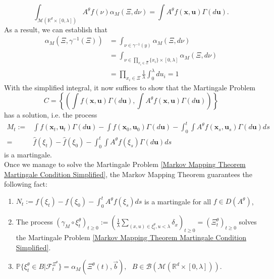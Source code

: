 \documentclass[12pt]{article}
\def \hat{\widehat}
\newcommand{\meanq}{\vec b}    %
\begin{document}
\begin{equation}
\int_{\mathcal{M}(\mathbb{R}^d\times [0,\lambda])}A^{\theta}f(\nu)\alpha_M(\Xi,d\nu)= \int   A^{\theta}f(\textbf{x},\textbf{u})\Gamma(d\textbf{u}). 
\end{equation}
As a result, we can establish that
\begin{equation}
\begin{aligned}
\alpha_M(\Xi,\gamma^{-1}(\Xi)) &= \int_{\nu \in \gamma^{-1}(y)}\alpha_M (\Xi,d\nu) \\
&= \int_{\nu \in \prod_{x_i \in \Xi} \{x_i\}\times [0,\lambda]}\alpha_M (\Xi,d\nu)\\
&= \prod_{x_i \in \Xi}\frac{1}{\lambda}\int_{0}^{\lambda} du_i =1
\end{aligned}
\end{equation}
With the simplified integral, it now suffices to show that the Martingale Problem 
\begin{equation}\label{Markov Mapping Theorem Martingale Condition Simplified}
C = \left\{\left(\int   f(\textbf{x},\textbf{u})\Gamma(d\textbf{u}),\int   A^{\theta}f(\textbf{x},\textbf{u})\Gamma(d\textbf{u})\right)\right\}    
\end{equation}
has a solution, i.e. the process
\begin{equation}
\begin{aligned}
M_t:=& \int   f(\textbf{x}_t,\textbf{u}_t)\Gamma(d\textbf{u})-\int   f(\textbf{x}_0,\textbf{u}_0)\Gamma(d\textbf{u})-\int_{0}^{t}\int   A^{\theta}f(\textbf{x}_s,\textbf{u}_s)\Gamma(d\textbf{u})ds\\
=&\hat{f}(\xi_t)-\hat{f}(\xi_0)-\int_{0}^{t}\int   A^{\theta}f(\xi_s)\Gamma(d\textbf{u})ds
\end{aligned}    
\end{equation}
is a martingale.\\
Once we manage to solve the Martingale Problem \eqref{Markov Mapping Theorem Martingale Condition Simplified}, the Markov Mapping Theorem guarantees the following fact:
\begin{enumerate}
    \item $N_t:=    f(\xi_t)-   f(\xi_0)-\int_{0}^{t}  A^{\theta}f(\xi_s)ds$ is a martingale for all $f\in D(A^{\theta})$,
    \item The process $(\gamma_M \circ \xi^{\theta}_t)_{t \geq 0}:= \left(\frac{1}{\lambda}\sum_{(x,u)\in \xi^{\theta}_t, u < \lambda} \delta_x\right)_{t \geq 0}=(\Xi^{\theta}_t)_{t \geq 0}$ solves the Martingale Problem \eqref{Markov Mapping Theorem Martingale Condition Simplified}.
    \item $\mathbb{P}\{\xi^{\theta}_t \in B | \mathcal{F}^{\Xi^{\theta}}_t\}=\alpha_M(\Xi^{\theta}(t),\meanq), ~~~B \in \mathcal{B}(\mathcal{M}(\mathbb{R}^d \times [0,\lambda])).$
\end{enumerate}
\end{document}
